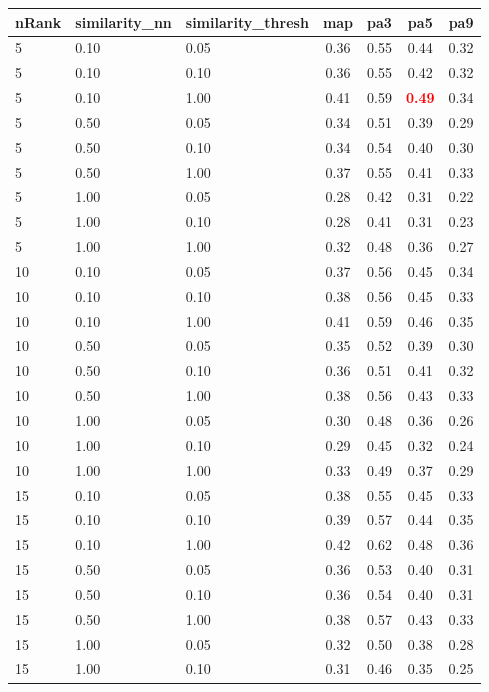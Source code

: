   
\begin{table} 
\begin{center} 
\scriptsize 
 \setlength{\tabcolsep}{.16667em} 
\begin{tabular}{lllcccc} 
nRank & similarity\_nn & similarity\_thresh & map & pa3 & pa5 & pa9 \\ 
\hline 
 5 & 0.10 & 0.05 & 0.36 & 0.55 & 0.44 & 0.32 \\ 
 5 & 0.10 & 0.10 & 0.36 & 0.55 & 0.42 & 0.32 \\ 
 5 & 0.10 & 1.00 & 0.41 & 0.59 & \textbf{\textcolor{red}{0.49}} & 0.34 \\ 
 5 & 0.50 & 0.05 & 0.34 & 0.51 & 0.39 & 0.29 \\ 
 5 & 0.50 & 0.10 & 0.34 & 0.54 & 0.40 & 0.30 \\ 
 5 & 0.50 & 1.00 & 0.37 & 0.55 & 0.41 & 0.33 \\ 
 5 & 1.00 & 0.05 & 0.28 & 0.42 & 0.31 & 0.22 \\ 
 5 & 1.00 & 0.10 & 0.28 & 0.41 & 0.31 & 0.23 \\ 
 5 & 1.00 & 1.00 & 0.32 & 0.48 & 0.36 & 0.27 \\ 
10 & 0.10 & 0.05 & 0.37 & 0.56 & 0.45 & 0.34 \\ 
10 & 0.10 & 0.10 & 0.38 & 0.56 & 0.45 & 0.33 \\ 
10 & 0.10 & 1.00 & 0.41 & 0.59 & 0.46 & 0.35 \\ 
10 & 0.50 & 0.05 & 0.35 & 0.52 & 0.39 & 0.30 \\ 
10 & 0.50 & 0.10 & 0.36 & 0.51 & 0.41 & 0.32 \\ 
10 & 0.50 & 1.00 & 0.38 & 0.56 & 0.43 & 0.33 \\ 
10 & 1.00 & 0.05 & 0.30 & 0.48 & 0.36 & 0.26 \\ 
10 & 1.00 & 0.10 & 0.29 & 0.45 & 0.32 & 0.24 \\ 
10 & 1.00 & 1.00 & 0.33 & 0.49 & 0.37 & 0.29 \\ 
15 & 0.10 & 0.05 & 0.38 & 0.55 & 0.45 & 0.33 \\ 
15 & 0.10 & 0.10 & 0.39 & 0.57 & 0.44 & 0.35 \\ 
15 & 0.10 & 1.00 & 0.42 & 0.62 & 0.48 & 0.36 \\ 
15 & 0.50 & 0.05 & 0.36 & 0.53 & 0.40 & 0.31 \\ 
15 & 0.50 & 0.10 & 0.36 & 0.54 & 0.40 & 0.31 \\ 
15 & 0.50 & 1.00 & 0.38 & 0.57 & 0.43 & 0.33 \\ 
15 & 1.00 & 0.05 & 0.32 & 0.50 & 0.38 & 0.28 \\ 
15 & 1.00 & 0.10 & 0.31 & 0.46 & 0.35 & 0.25 \\ 

\end{tabular}
\end{center}
\end{table}
